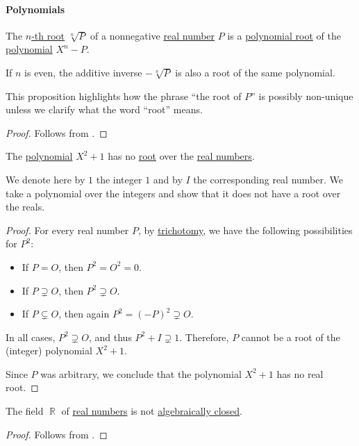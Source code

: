 \paragraph{Polynomials}

\begin{proposition}\label{thm:nth_root_polynomial}
  The \hyperref[def:nth_root]{\( n \)-th root} \( \sqrt[n]{ P } \) of a nonnegative \hyperref[def:real_numbers]{real number} \( P \) is a \hyperref[def:polynomial_root]{polynomial root} of the \hyperref[def:polynomial_algebra/polynomials]{polynomial} \( X^n - P \).

  If \( n \) is even, the additive inverse \( -\sqrt[n]{ P } \) is also a root of the same polynomial.
\end{proposition}
\begin{comments}
  \item This proposition highlights how the phrase \enquote{the root of \( P \)} is possibly non-unique unless we clarify what the word \enquote{root} means.
\end{comments}
\begin{proof}
  Follows from .
\end{proof}

\begin{proposition}\label{thm:x2_plus_one_no_root}
  The \hyperref[def:polynomial_algebra/polynomials]{polynomial} \( X^2 + 1 \) has no \hyperref[def:polynomial_root]{root} over the \hyperref[def:real_numbers]{real numbers}.
\end{proposition}
\begin{comments}
  \item We denote here by \( 1 \) the integer \( 1 \) and by \( I \) the corresponding real number. We take a polynomial over the integers and show that it does not have a root over the reals.
\end{comments}
\begin{proof}
  For every real number \( P \), by \hyperref[def:binary_relation/trichotomy]{trichotomy}, we have the following possibilities for \( P^2 \):
  \begin{itemize}
    \item If \( P = O \), then \( P^2 = O^2 = 0 \).
    \item If \( P \supsetneq O \), then \( P^2 \supsetneq O \).
    \item If \( P \subsetneq O \), then again \( P^2 = (-P)^2 \supsetneq O \).
  \end{itemize}

  In all cases, \( P^2 \supsetneq O \), and thus \( P^2 + I \supsetneq 1 \). Therefore, \( P \) cannot be a root of the (integer) polynomial \( X^2 + 1 \).

  Since \( P \) was arbitrary, we conclude that the polynomial \( X^2 + 1 \) has no real root.
\end{proof}

\begin{proposition}\label{thm:reals_not_algebraically_closed}
  The field \( \BbbR \) of \hyperref[def:real_numbers]{real numbers} is not \hyperref[def:algebraically_closed_field]{algebraically closed}.
\end{proposition}
\begin{proof}
  Follows from .
\end{proof}
